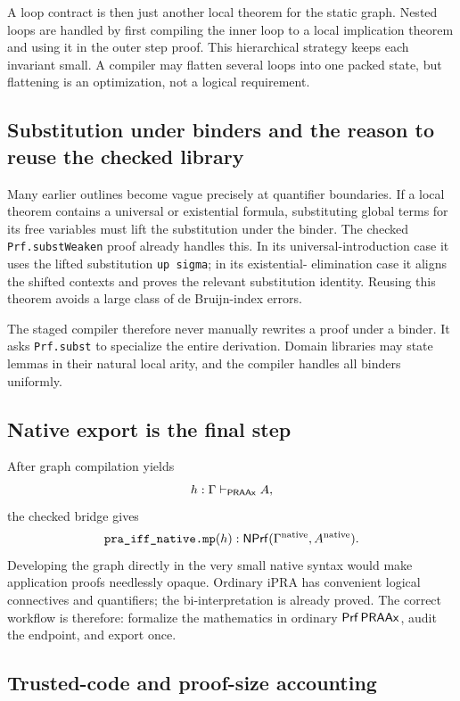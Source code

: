 A loop contract is then just another local theorem for the static graph.  Nested loops are handled by first
compiling the inner loop to a local implication theorem and using it in the outer step proof.  This
hierarchical strategy keeps each invariant small.  A compiler may flatten several loops into one packed
state, but flattening is an optimization, not a logical requirement.

\subsection{Substitution under binders and the reason to reuse the checked library}

Many earlier outlines become vague precisely at quantifier boundaries.  If a local theorem contains a
universal or existential formula, substituting global terms for its free variables must lift the
substitution under the binder.  The checked \texttt{Prf.substWeaken} proof already handles this.  In its
universal-introduction case it uses the lifted substitution \texttt{up sigma}; in its existential-
elimination case it aligns the shifted contexts and proves the relevant substitution identity.  Reusing
this theorem avoids a large class of de Bruijn-index errors.

The staged compiler therefore never manually rewrites a proof under a binder.  It asks
\texttt{Prf.subst} to specialize the entire derivation.  Domain libraries may state lemmas in their natural
local arity, and the compiler handles all binders uniformly.

\subsection{Native export is the final step}

After graph compilation yields
\[
  h:\Gamma\vdash_{\mathsf{PRAAx}}A,
\]
the checked bridge gives
\[
 \texttt{pra\_iff\_native.mp}(h):
 \mathsf{NPrf}(\Gamma^{\mathrm{native}},A^{\mathrm{native}}).
\]
Developing the graph directly in the very small native syntax would make application proofs needlessly
opaque.  Ordinary iPRA has convenient logical connectives and quantifiers; the bi-interpretation is already
proved.  The correct workflow is therefore: formalize the mathematics in ordinary \(\mathsf{Prf}\,\mathsf{PRAAx}\), audit
the endpoint, and export once.

\subsection{Trusted-code and proof-size accounting}


